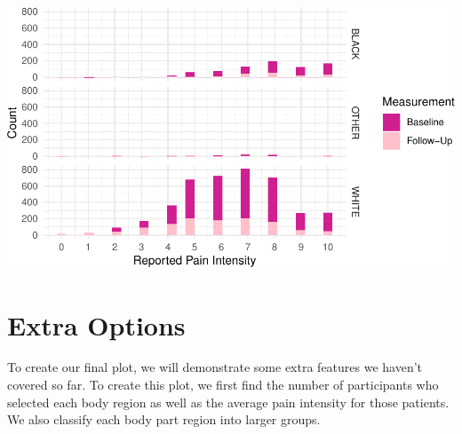 \documentclass[
  letterpaper,
]{krantz}
\begin{document}
\begin{center}
\includegraphics[width=1\textwidth,height=\textheight]{book/visualization_ggplot_files/figure-pdf/unnamed-chunk-20-1.pdf}
\end{center}

\section{Extra Options}\label{extra-options}

To create our final plot, we will demonstrate some extra features we
haven't covered so far. To create this plot, we first find the number of
participants who selected each body region as well as the average pain
intensity for those patients. We also classify each body part region
into larger groups.
\end{document}
